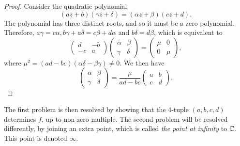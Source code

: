 \documentclass[main.tex]{subfiles}
\begin{document}
		\begin{proof}
			Consider the quadratic polynomial
			\begin{equation*}
				(az + b)(\gamma z + \delta) = (\alpha z + \beta)(cz + d).
			\end{equation*}
			The polynomial has three distinct roots, and so it must be a zero polynomial. Therefore, $a\gamma = c\alpha, b\gamma + a \delta = c\beta + d\alpha$ and $b\delta = d\beta$, which is equivalent to
			\begin{equation*}
				\begin{pmatrix}
					d & -b\\
					-c & a
				\end{pmatrix}
				\begin{pmatrix}
				\alpha & \beta \\
				\gamma & \delta
				\end{pmatrix}
				=
				\begin{pmatrix}
					\mu		&	0\\
					0		& \mu
				\end{pmatrix},
			\end{equation*}
			where $\mu^2 = {(ad - bc)}{(\alpha\delta - \beta\gamma)}{ \neq 0}$. We then have
			\begin{equation*}
				\begin{pmatrix}
				\alpha & \beta \\
				\gamma & \delta
				\end{pmatrix}
				= \frac{\mu}{ad - bc}\begin{pmatrix}
				a & b \\
				c & d
				\end{pmatrix}.
			\end{equation*}%
		\end{proof}
		The first problem is then resolved by showing that the 4-tuple $(a,b,c,d)$ determines $f$, up to non-zero multiple. The second problem will be resolved differently, by joining an extra point, which is called \textit{the point at infinity} to $\mathbb C$. This point is denoted $\infty$.
	
\end{document}
